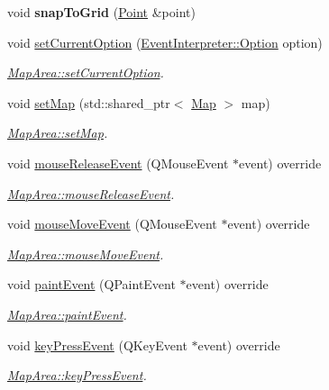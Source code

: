 \begin{DoxyCompactItemize}
\item 
\hypertarget{classMapArea_a1f1fdfea7ebfa23044ce5a1de1f59103}{void {\bfseries snap\-To\-Grid} (\hyperlink{classPoint}{Point} \&point)}\label{classMapArea_a1f1fdfea7ebfa23044ce5a1de1f59103}

\item 
void \hyperlink{classMapArea_aa4606f2ca69c765208a00eb60631c2c6}{set\-Current\-Option} (\hyperlink{classEventInterpreter_a1b63d40701a33e256a8cbbf44c6be8d2}{Event\-Interpreter\-::\-Option} option)
\begin{DoxyCompactList}\small\item\em \hyperlink{classMapArea_aa4606f2ca69c765208a00eb60631c2c6}{Map\-Area\-::set\-Current\-Option}. \end{DoxyCompactList}\item 
void \hyperlink{classMapArea_a09a8e74bb39226421fb8ce2673e33949}{set\-Map} (std\-::shared\-\_\-ptr$<$ \hyperlink{classMap}{Map} $>$ map)
\begin{DoxyCompactList}\small\item\em \hyperlink{classMapArea_a09a8e74bb39226421fb8ce2673e33949}{Map\-Area\-::set\-Map}. \end{DoxyCompactList}\item 
void \hyperlink{classMapArea_a48f8eeda7ca7922cfa1b4d443d086c22}{mouse\-Release\-Event} (Q\-Mouse\-Event $\ast$event) override
\begin{DoxyCompactList}\small\item\em \hyperlink{classMapArea_a48f8eeda7ca7922cfa1b4d443d086c22}{Map\-Area\-::mouse\-Release\-Event}. \end{DoxyCompactList}\item 
void \hyperlink{classMapArea_a8f69f04bde503830f393505d9249d75d}{mouse\-Move\-Event} (Q\-Mouse\-Event $\ast$event) override
\begin{DoxyCompactList}\small\item\em \hyperlink{classMapArea_a8f69f04bde503830f393505d9249d75d}{Map\-Area\-::mouse\-Move\-Event}. \end{DoxyCompactList}\item 
void \hyperlink{classMapArea_aa8cf9ced7e4c3a4a7336eb8c8e43086e}{paint\-Event} (Q\-Paint\-Event $\ast$event) override
\begin{DoxyCompactList}\small\item\em \hyperlink{classMapArea_aa8cf9ced7e4c3a4a7336eb8c8e43086e}{Map\-Area\-::paint\-Event}. \end{DoxyCompactList}\item 
void \hyperlink{classMapArea_ac3eab2d89eb976b0c4b06e8c032a54bd}{key\-Press\-Event} (Q\-Key\-Event $\ast$event) override
\begin{DoxyCompactList}\small\item\em \hyperlink{classMapArea_ac3eab2d89eb976b0c4b06e8c032a54bd}{Map\-Area\-::key\-Press\-Event}. \end{DoxyCompactList}\end{DoxyCompactItemize}


